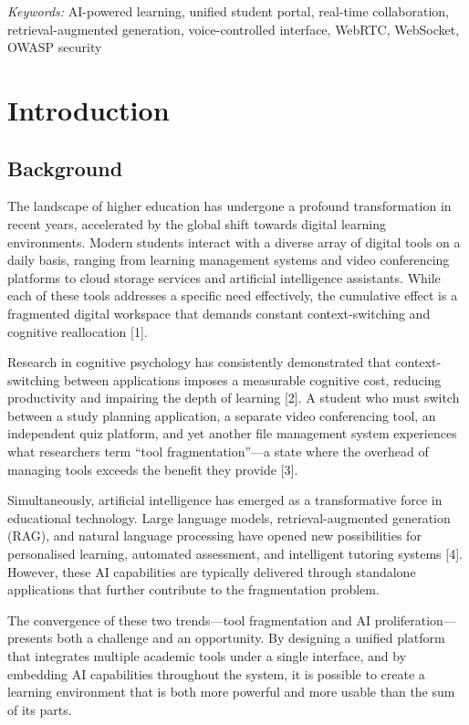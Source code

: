\documentclass[12pt,a4paper]{report}
\begin{document}
\textit{Keywords:} AI-powered learning, unified student portal, real-time collaboration, retrieval-augmented generation, voice-controlled interface, WebRTC, WebSocket, OWASP security

\chapter{Introduction}

\section{Background}

The landscape of higher education has undergone a profound transformation in recent years, accelerated by the global shift towards digital learning environments. Modern students interact with a diverse array of digital tools on a daily basis, ranging from learning management systems and video conferencing platforms to cloud storage services and artificial intelligence assistants. While each of these tools addresses a specific need effectively, the cumulative effect is a fragmented digital workspace that demands constant context-switching and cognitive reallocation [1].

Research in cognitive psychology has consistently demonstrated that context-switching between applications imposes a measurable cognitive cost, reducing productivity and impairing the depth of learning [2]. A student who must switch between a study planning application, a separate video conferencing tool, an independent quiz platform, and yet another file management system experiences what researchers term ``tool fragmentation''---a state where the overhead of managing tools exceeds the benefit they provide [3].

Simultaneously, artificial intelligence has emerged as a transformative force in educational technology. Large language models, retrieval-augmented generation (RAG), and natural language processing have opened new possibilities for personalised learning, automated assessment, and intelligent tutoring systems [4]. However, these AI capabilities are typically delivered through standalone applications that further contribute to the fragmentation problem.

The convergence of these two trends---tool fragmentation and AI proliferation---presents both a challenge and an opportunity. By designing a unified platform that integrates multiple academic tools under a single interface, and by embedding AI capabilities throughout the system, it is possible to create a learning environment that is both more powerful and more usable than the sum of its parts.
\end{document}
